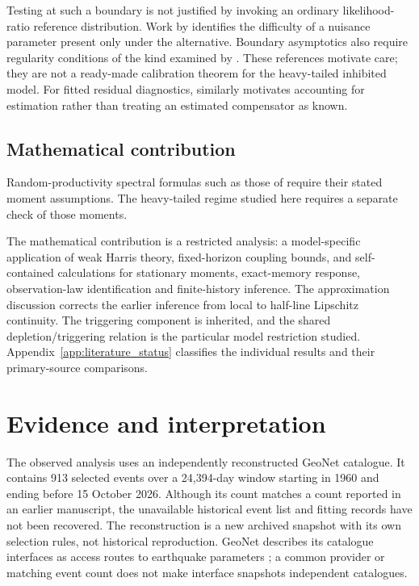 Testing at such a boundary is not justified by invoking an ordinary likelihood-ratio reference distribution. Work by \citet{Davies1977,Davies1987} identifies the difficulty of a nuisance parameter present only under the alternative. Boundary asymptotics also require regularity conditions of the kind examined by \citet{SelfLiang1987}. These references motivate care; they are not a ready-made calibration theorem for the heavy-tailed inhibited model. For fitted residual diagnostics, \citet{KlingVetter2024} similarly motivates accounting for estimation rather than treating an estimated compensator as known.

\subsection{Mathematical contribution}

Random-productivity spectral formulas such as those of \citet{BremaudMassoulie2002} require their stated moment assumptions. The heavy-tailed regime studied here requires a separate check of those moments.

The mathematical contribution is a restricted analysis: a model-specific application of weak Harris theory, fixed-horizon coupling bounds, and self-contained calculations for stationary moments, exact-memory response, observation-law identification and finite-history inference. The approximation discussion corrects the earlier inference from local to half-line Lipschitz continuity. The triggering component is inherited, and the shared depletion/triggering relation is the particular model restriction studied. Appendix~\ref{app:literature_status} classifies the individual results and their primary-source comparisons.

\section{Evidence and interpretation}
\label{sec:intro_evidence}

The observed analysis uses an independently reconstructed GeoNet catalogue. It contains 913 selected events over a 24,394-day window starting in 1960 and ending before 15 October 2026. Although its count matches a count reported in an earlier manuscript, the unavailable historical event list and fitting records have not been recovered. The reconstruction is a new archived snapshot with its own selection rules, not historical reproduction. GeoNet describes its catalogue interfaces as access routes to earthquake parameters \citep{GeoNetCatalogue}; a common provider or matching event count does not make interface snapshots independent catalogues.

